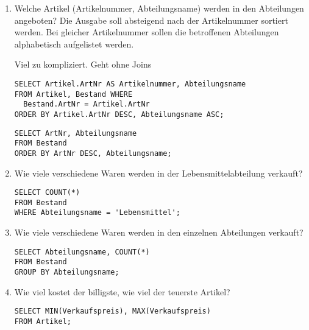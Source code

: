 \documentclass{lehramt-informatik-aufgabe}
\begin{document}
\begin{enumerate}


\item Welche Artikel (Artikelnummer, Abteilungsname) werden in den
Abteilungen angeboten? Die Ausgabe soll absteigend nach der
Artikelnummer sortiert werden. Bei gleicher Artikelnummer sollen die
betroffenen Abteilungen alphabetisch aufgelistet werden.

\begin{antwort}[richtig]
Viel zu kompliziert. Geht ohne Joins
\begin{verbatim}
SELECT Artikel.ArtNr AS Artikelnummer, Abteilungsname
FROM Artikel, Bestand WHERE
  Bestand.ArtNr = Artikel.ArtNr
ORDER BY Artikel.ArtNr DESC, Abteilungsname ASC;
\end{verbatim}
\end{antwort}

\begin{antwort}[muster]
\begin{verbatim}
SELECT ArtNr, Abteilungsname
FROM Bestand
ORDER BY ArtNr DESC, Abteilungsname;
\end{verbatim}
\end{antwort}

\item Wie viele verschiedene Waren werden in der Lebensmittelabteilung
verkauft?

\begin{antwort}[muster]
\begin{verbatim}
SELECT COUNT(*)
FROM Bestand
WHERE Abteilungsname = 'Lebensmittel';
\end{verbatim}
\end{antwort}


\item Wie viele verschiedene Waren werden in den einzelnen Abteilungen
verkauft?

\begin{antwort}[muster]
\begin{verbatim}
SELECT Abteilungsname, COUNT(*)
FROM Bestand
GROUP BY Abteilungsname;
\end{verbatim}
\end{antwort}


\item Wie viel kostet der billigste, wie viel der teuerste Artikel?

\begin{antwort}[muster]
\begin{verbatim}
SELECT MIN(Verkaufspreis), MAX(Verkaufspreis)
FROM Artikel;
\end{verbatim}
\end{antwort}


\end{enumerate}
\end{document}
